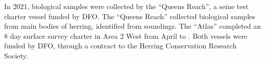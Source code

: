 In 2021, biological samples were collected by the ``Queens Reach'',
a seine test charter vessel funded by DFO.
The ``Queens Reach'' collected biological samples from main bodies of herring,
identified from soundings.
The ``Atlas'' completed an 8 day surface survey charter in Area 2 West from April  to .
Both vessels were funded by DFO, through a contract to the Herring Conservation Research Society.
